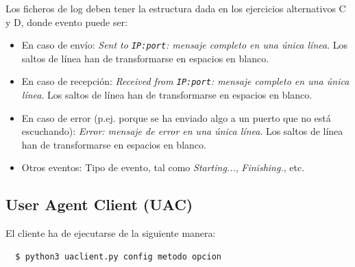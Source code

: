 \documentclass[a4paper,11pt]{article}
\begin{document}
Los ficheros de log deben tener la estructura dada en los ejercicios alternativos C y D, donde evento puede ser:

\begin{itemize}
  \item En caso de envío: \emph{Sent to \texttt{IP:port}: mensaje completo en una única línea}. Los saltos de línea han de transformarse en espacios en blanco.
  \item En caso de recepción: \emph {Received from \texttt{IP:port}: mensaje completo en una única línea}. Los saltos de línea han de transformarse en espacios en blanco.
  \item En caso de error (p.ej. porque se ha enviado algo a un puerto que no está escuchando): \emph{Error: mensaje de error en una única línea}. Los saltos de línea han de transformarse en espacios en blanco.
  \item Otros eventos: Tipo de evento, tal como \emph{Starting...}, \emph{Finishing.}, etc.
\end{itemize}



\subsection{User Agent Client (UAC)}

El cliente ha de ejecutarse de la siguiente manera:
\begin{verbatim}
  $ python3 uaclient.py config metodo opcion
\end{verbatim}
\end{document}
